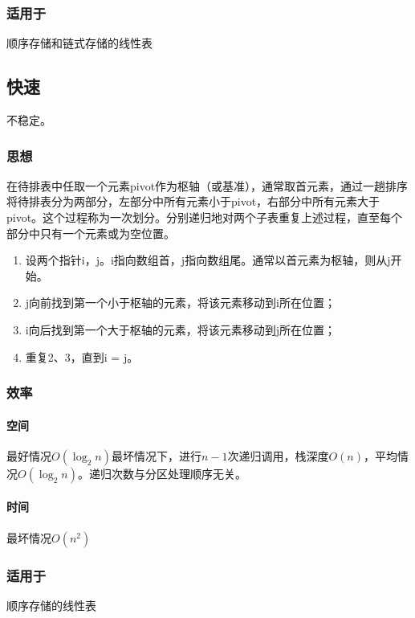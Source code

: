 \subsubsection{适用于}
顺序存储和链式存储的线性表


\subsection{快速}
不稳定。

\subsubsection{思想}
在待排表中任取一个元素pivot作为枢轴（或基准），通常取首元素，通过一趟排序将待排表分为两部分，左部分中所有元素小于pivot，右部分中所有元素大于pivot。这个过程称为一次划分。分别递归地对两个子表重复上述过程，直至每个部分中只有一个元素或为空位置。
\begin{enumerate}
    \item 设两个指针i，j。i指向数组首，j指向数组尾。通常以首元素为枢轴，则从j开始。
    \item j向前找到第一个小于枢轴的元素，将该元素移动到i所在位置；
    \item i向后找到第一个大于枢轴的元素，将该元素移动到j所在位置；
    \item 重复2、3，直到i = j。
\end{enumerate}


\subsubsection{效率}

\paragraph{空间}
最好情况\(O(\log_2n)\)最坏情况下，进行\(n - 1\)次递归调用，栈深度\(O(n)\)，平均情况\(O(\log_2n)\)。递归次数与分区处理顺序无关。

\paragraph{时间}
最坏情况\(O(n^2)\)


\subsubsection{适用于}
顺序存储的线性表


